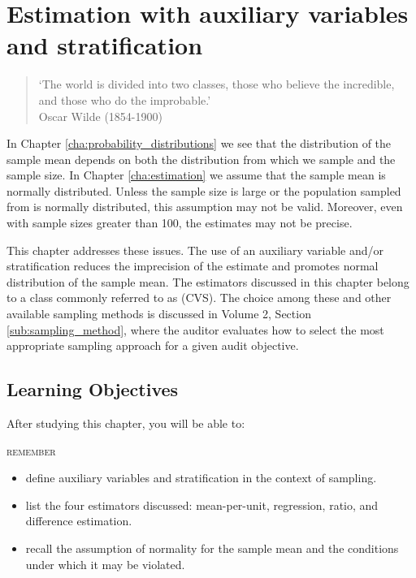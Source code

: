 \chapter{Estimation with auxiliary variables and stratification} %
\label{cha:stratified_sampling}



\begin{quote}
`The world is divided into two classes, those who believe the incredible, and those who do the improbable.'\\
Oscar Wilde (1854-1900)
\end{quote}


In Chapter \ref{cha:probability_distributions} we see that the distribution of the sample mean depends on both the distribution from which we sample and the sample size. In Chapter \ref{cha:estimation} we assume that the sample mean is normally distributed. Unless the sample size is large or the population sampled from is normally distributed, this assumption may not be valid. Moreover, even with sample sizes greater than 100, the estimates may not be precise.

This chapter addresses these issues. The use of an auxiliary variable and/or stratification reduces the imprecision of the estimate and promotes normal distribution of the sample mean. The estimators discussed in this chapter belong to a class commonly referred to as  (CVS). The choice among these and other available sampling methods is discussed in Volume 2, Section \ref{sub:sampling_method}, where the auditor evaluates how to select the most appropriate sampling approach for a given audit objective.

\section*{Learning Objectives}

After studying this chapter, you will be able to:

\bigskip
\noindent \textsc{remember}

\begin{itemize}

\item define auxiliary variables and stratification in the context of sampling.
\item list the four estimators discussed: mean-per-unit, regression, ratio, and difference estimation.
\item recall the assumption of normality for the sample mean and the conditions under which it may be violated.
\end{itemize}

